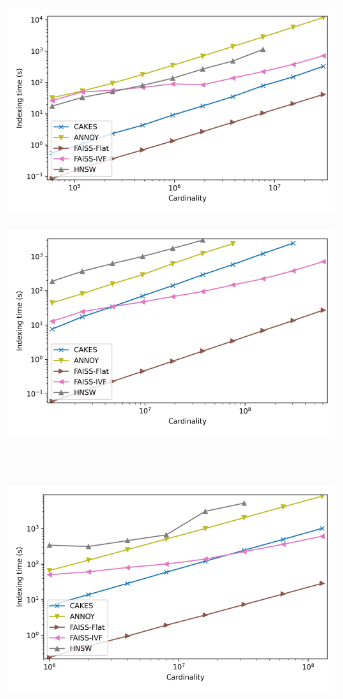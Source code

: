 \documentclass[review,supplement,onefignum,onetabnum]{siamonline220329}
\begin{document}
\begin{figure}
    \begin{subfigure}[b]{0.47\textwidth}
        \includegraphics[width=0.95\textwidth]{plots/fashion-mnist-indexing.png}\\
        \label{fig:supplement:fashion-mnist-indexing}
    \end{subfigure}%
    \begin{subfigure}[b]{0.47\textwidth}
        \includegraphics[width=0.95\textwidth]{plots/glove-25-indexing.png}\\
        \label{fig:supplement:glove-25-indexing}
    \end{subfigure}
    \vspace{1em}
    \\
    \begin{subfigure}[b]{0.47\textwidth}
        \includegraphics[width=0.95\textwidth]{plots/sift-indexing.png}\\

\end{subfigure}
\end{figure}
\end{document}
